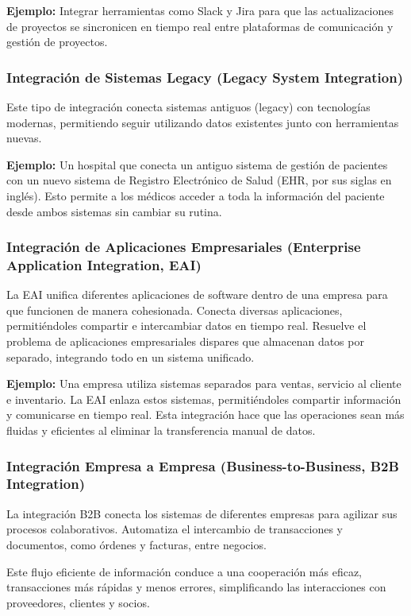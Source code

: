 \documentclass[12pt]{book}
\begin{document}
\textbf{Ejemplo:} Integrar herramientas como Slack y Jira para que las actualizaciones de proyectos se sincronicen en tiempo real entre plataformas de comunicación y gestión de proyectos.

\subsubsection{Integración de Sistemas Legacy (Legacy System Integration)}
Este tipo de integración conecta sistemas antiguos (legacy) con tecnologías modernas, permitiendo seguir utilizando datos existentes junto con herramientas nuevas.

\textbf{Ejemplo:} Un hospital que conecta un antiguo sistema de gestión de pacientes con un nuevo sistema de Registro Electrónico de Salud (EHR, por sus siglas en inglés). Esto permite a los médicos acceder a toda la información del paciente desde ambos sistemas sin cambiar su rutina.

\subsubsection{Integración de Aplicaciones Empresariales (Enterprise Application Integration, EAI)}
La EAI unifica diferentes aplicaciones de software dentro de una empresa para que funcionen de manera cohesionada. Conecta diversas aplicaciones, permitiéndoles compartir e intercambiar datos en tiempo real. Resuelve el problema de aplicaciones empresariales dispares que almacenan datos por separado, integrando todo en un sistema unificado.

\textbf{Ejemplo:} Una empresa utiliza sistemas separados para ventas, servicio al cliente e inventario. La EAI enlaza estos sistemas, permitiéndoles compartir información y comunicarse en tiempo real. Esta integración hace que las operaciones sean más fluidas y eficientes al eliminar la transferencia manual de datos.

\subsubsection{Integración Empresa a Empresa (Business-to-Business, B2B Integration)}
La integración B2B conecta los sistemas de diferentes empresas para agilizar sus procesos colaborativos. Automatiza el intercambio de transacciones y documentos, como órdenes y facturas, entre negocios.

Este flujo eficiente de información conduce a una cooperación más eficaz, transacciones más rápidas y menos errores, simplificando las interacciones con proveedores, clientes y socios.
\end{document}
